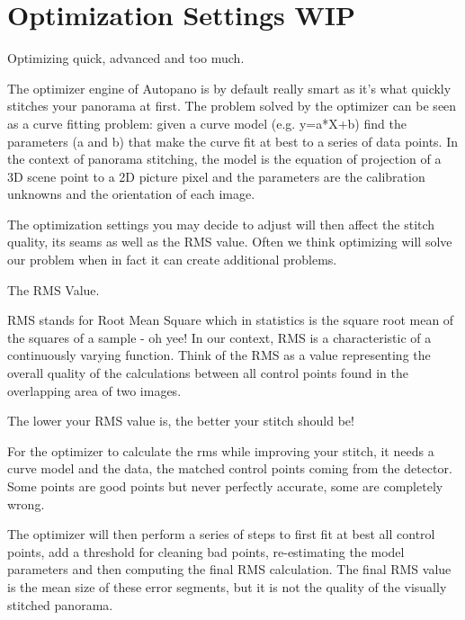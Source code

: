 \chapter{Optimization Settings WIP}
\pagecolor{white}
\label{chap:35}
\begin{fullwidth}

\problem

{\large Optimizing quick, advanced and too much. \par}

The optimizer engine of Autopano is by default really smart as it’s what quickly stitches your panorama at first. The problem solved by the optimizer can be seen as a curve fitting problem: given a curve model (e.g. y=a*X+b) find the parameters (a and b) that make the curve fit at best to a series of data points. In the context of panorama stitching, the model is the equation of projection of a 3D scene point to a 2D picture pixel and the parameters are the calibration unknowns and the orientation of each image.

The optimization settings you may decide to adjust will then affect the stitch quality, its seams as well as the RMS value. Often we think optimizing will solve our problem when in fact it can create additional problems.


\solution

{\large The RMS Value. \par}

RMS stands for Root Mean Square which in statistics is the square root mean of the squares of a sample - oh yee! In our context, RMS is a characteristic of a continuously varying function. Think of the RMS as a value representing the overall quality of the calculations between all control points found in the overlapping area of two images.

The lower your RMS value is, the better your stitch should be!

For the optimizer to calculate the rms while improving your stitch, it needs a curve model and the data, the matched control points coming from the detector. Some points are good points but never perfectly accurate, some are completely wrong. 

The optimizer will then perform a series of steps to first fit at best all control points, add a threshold for cleaning bad points, re-estimating the model parameters and then computing the final RMS calculation. The final RMS value is the mean size of these error segments, but it is not the quality of the visually stitched panorama.


\end{fullwidth}
